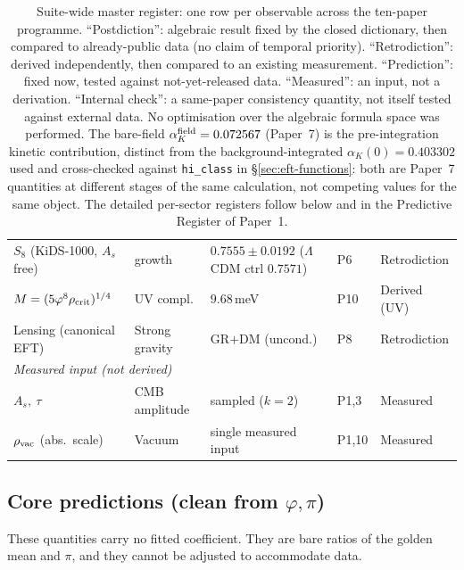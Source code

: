 \documentclass[a4paper,11pt]{article}
\begin{document}
\begin{table}[h]
{\begin{tabular}{@{}lllll@{}}
$S_8$ (KiDS-1000, $A_s$ free) & growth  & $0.7555\pm0.0192$ ($\Lambda$CDM ctrl $0.7571$) & P6 & Retrodiction \\
$M=(5\varphi^8\rho_{\rm crit})^{1/4}$ & UV compl.  & $9.68\,$meV                    & P10    & Derived (UV) \\
Lensing (canonical EFT)       & Strong gravity    & GR$+$DM (uncond.)              & P8     & Retrodiction \\
\midrule
\multicolumn{5}{l}{\textit{Measured input (not derived)}} \\
$A_s,\ \tau$                  & CMB amplitude     & sampled ($k=2$)                & P1,3   & Measured \\
$\rho_{\rm vac}$ (abs.\ scale) & Vacuum            & single measured input          & P1,10  & Measured \\
\bottomrule
\end{tabular}%
}
\caption{Suite-wide master register: one row per observable across the ten-paper
programme. ``Postdiction'': algebraic result fixed by the closed dictionary, then
compared to already-public data (no claim of temporal priority). ``Retrodiction'':
derived independently, then compared to an existing measurement. ``Prediction'':
fixed now, tested against not-yet-released data. ``Measured'': an input, not a
derivation. ``Internal check'': a same-paper consistency quantity, not itself
tested against external data. No optimisation over the algebraic formula space
was performed. The bare-field $\alpha_K^{\rm field}=0.072567$ (Paper~7) is the
pre-integration kinetic contribution, distinct from the background-integrated
$\alpha_K(0)=0.403302$ used and cross-checked against \texttt{hi\_class} in
\S\ref{sec:eft-functions}: both are Paper~7 quantities at different stages of
the same calculation, not competing values for the same object. The detailed
per-sector registers follow below and in the Predictive Register of Paper~1.}
\label{tab:master}
\end{table}

\subsection{Core predictions (clean from $\varphi,\pi$)}

These quantities carry no fitted coefficient. They are bare ratios of the
golden mean and $\pi$, and they cannot be adjusted to accommodate data.
\end{document}
